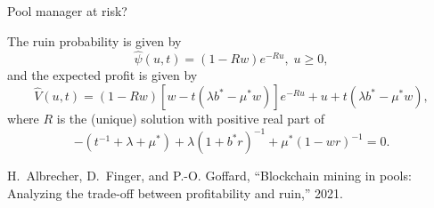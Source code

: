 \documentclass{beamer}
\def \w{\widehat}
\begin{document}
\begin{frame}{Pool manager at risk?}
\scriptsize
\begin{tcolorbox}[enhanced,drop shadow, title=Theorem (Profit and ruin of the pool manager)]
The ruin probability is given by 
\begin{equation*}\label{psiexpe}
    \widehat{\psi}(u,t) = (1-Rw)  e^{-R u},\;u\ge 0,
\end{equation*}
and the expected profit is given by
\begin{equation*}\label{Vcombexpe}
    \w{V}(u,t) = (1 - Rw)[w-t(\lambda b^\ast-\mu^\ast w)] e^{-R u}+u+t(\lambda b^\ast-\mu^\ast w),
\end{equation*}
where $R$ is the (unique) solution with positive real part of 
\begin{equation*} \label{VLunde}
    -(t^{-1}+\lambda+\mu^\ast)+\lambda(1+b^\ast r)^{-1}+\mu^\ast(1-wr)^{-1}=0.
\end{equation*}
\end{tcolorbox}
\tiny
  \begin{thebibliography}{1}

H.~Albrecher, D.~Finger, and P.-O. Goffard, ``Blockchain mining in pools:
  Analyzing the trade-off between profitability and ruin,'' 2021.


\end{thebibliography}
\end{frame}
\end{document}

